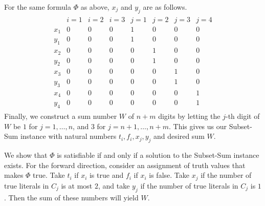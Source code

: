 \begin{pf}
\begin{enumerate}[(1)]
    \end{enumerate}
    For the same formula $\Phi$ as above, $x_j$ and $y_j$ are as follows. 
    \begin{align*}
        \begin{array}{c|ccc|cccc}
            & i=1 & i=2 & i=3 & j=1 & j=2 & j=3 & j=4 \\ \hline 
            x_1 & 0 & 0 & 0 & 1 & 0 & 0 & 0 \\ 
            y_1 & 0 & 0 & 0 & 1 & 0 & 0 & 0 \\ 
            x_2 & 0 & 0 & 0 & 0 & 1 & 0 & 0 \\ 
            y_2 & 0 & 0 & 0 & 0 & 1 & 0 & 0 \\ 
            x_3 & 0 & 0 & 0 & 0 & 0 & 1 & 0 \\ 
            y_3 & 0 & 0 & 0 & 0 & 0 & 1 & 0 \\
            x_4 & 0 & 0 & 0 & 0 & 0 & 0 & 1 \\ 
            y_4 & 0 & 0 & 0 & 0 & 0 & 0 & 1
        \end{array}
    \end{align*}
    Finally, we construct a sum number $W$ of $n+m$ digits by letting 
    the $j$-th digit of $W$ be $1$ for $j = 1, \dots, n$, and 
    $3$ for $j = n+1, \dots, n+m$. This gives us our {\sc Subset-Sum} 
    instance with natural numbers $t_i, f_i, x_j, y_j$ and desired 
    sum $W$. 

    We show that $\Phi$ is satisfiable if and only if a solution to the 
    {\sc Subset-Sum} instance exists. For the forward direction, 
    consider an assignment of truth values that makes $\Phi$ true. 
    Take $t_i$ if $x_i$ is true and $f_i$ if $x_i$ is false. Take 
    $x_j$ if the number of true literals in $C_j$ is at most $2$, 
    and take $y_j$ if the number of true literals in $C_j$ is $1$. 
    Then the sum of these numbers will yield $W$. 
    

\end{pf}
